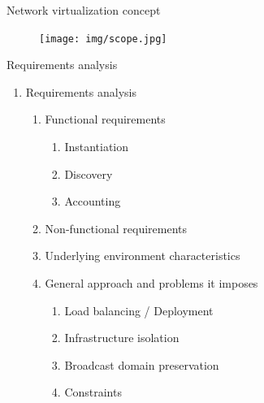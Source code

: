 \documentclass{beamer}
\begin{document}
\setcounter{enumi_chapter}{\value{enumi}}

\begin{frame}{Network virtualization concept}
		
	\begin{figure}[H]
		\texttt{[image: img/scope.jpg]}
	\end{figure}

\end{frame}

\setcounter{enumi_chapter}{\value{enumi}}


\begin{frame}{Requirements analysis}

	\begin{enumerate}
		\setcounter{enumi}{\value{enumi_chapter}}

		\item Requirements analysis

			\begin{enumerate}

				\item Functional requirements

					\begin{enumerate}
						\item Instantiation
						\item Discovery
						\item Accounting
					\end{enumerate}

					\pause
			
			 \item Non-functional requirements \pause

			 \item Underlying environment characteristics \pause
		 
			 \item General approach and problems it imposes

			 	\begin{enumerate}
					\item Load balancing / Deployment
					\item Infrastructure isolation
					\item Broadcast domain preservation
					\item Constraints
				\end{enumerate}
		 
			\end{enumerate}

	\end{enumerate}

\end{frame}
\end{document}
